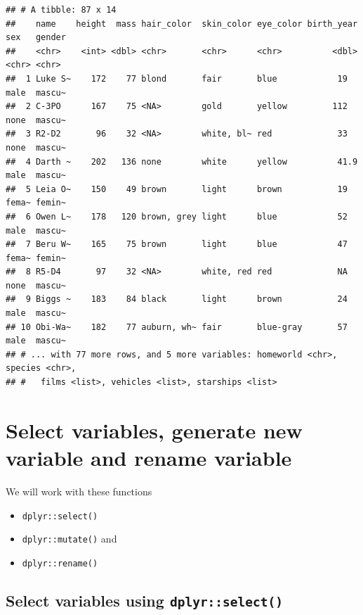 \documentclass[
]{book}
\providecommand{\tightlist}{%
  \setlength{\itemsep}{0pt}\setlength{\parskip}{0pt}}
\begin{document}
\begin{verbatim}
## # A tibble: 87 x 14
##    name    height  mass hair_color  skin_color eye_color birth_year sex   gender
##    <chr>    <int> <dbl> <chr>       <chr>      <chr>          <dbl> <chr> <chr> 
##  1 Luke S~    172    77 blond       fair       blue            19   male  mascu~
##  2 C-3PO      167    75 <NA>        gold       yellow         112   none  mascu~
##  3 R2-D2       96    32 <NA>        white, bl~ red             33   none  mascu~
##  4 Darth ~    202   136 none        white      yellow          41.9 male  mascu~
##  5 Leia O~    150    49 brown       light      brown           19   fema~ femin~
##  6 Owen L~    178   120 brown, grey light      blue            52   male  mascu~
##  7 Beru W~    165    75 brown       light      blue            47   fema~ femin~
##  8 R5-D4       97    32 <NA>        white, red red             NA   none  mascu~
##  9 Biggs ~    183    84 black       light      brown           24   male  mascu~
## 10 Obi-Wa~    182    77 auburn, wh~ fair       blue-gray       57   male  mascu~
## # ... with 77 more rows, and 5 more variables: homeworld <chr>, species <chr>,
## #   films <list>, vehicles <list>, starships <list>
\end{verbatim}

\hypertarget{select-variables-generate-new-variable-and-rename-variable}{%
\section{Select variables, generate new variable and rename variable}\label{select-variables-generate-new-variable-and-rename-variable}}

We will work with these functions

\begin{itemize}
\tightlist
\item
  \texttt{dplyr::select()}
\item
  \texttt{dplyr::mutate()} and
\item
  \texttt{dplyr::rename()}
\end{itemize}

\hypertarget{select-variables-using-dplyrselect}{%
\subsection{\texorpdfstring{Select variables using \texttt{dplyr::select()}}{Select variables using dplyr::select()}}\label{select-variables-using-dplyrselect}}
\end{document}
